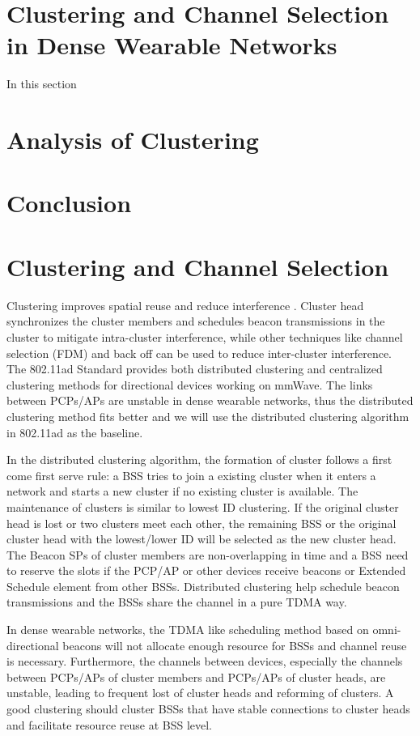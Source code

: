 \documentclass[10pt, conference, letterpaper]{IEEEtran}
\begin{document}
\section{Clustering and Channel Selection in Dense Wearable Networks}\label{section:MAC}
In this section 
\section{Analysis of Clustering}\label{section:clusteranalysis}
\section{Conclusion}\label{section:conclusion}

\newpage


\section{Clustering and Channel Selection}
Clustering improves spatial reuse and reduce interference \cite{80211ad}. Cluster head synchronizes the cluster members and schedules beacon transmissions in the cluster to mitigate intra-cluster interference, while other techniques like channel selection (FDM) and back off \cite{backoff} can be used to reduce inter-cluster interference. The 802.11ad Standard provides both distributed clustering and centralized clustering methods for directional devices working on mmWave. The links between PCPs/APs are unstable in dense wearable networks, thus the distributed clustering method fits better and we will use the distributed clustering algorithm in 802.11ad as the baseline.

In the distributed clustering algorithm, the formation of cluster follows a first come first serve rule: a BSS tries to join a existing cluster when it enters a network and starts a new cluster if no existing cluster is available. The maintenance of clusters is similar to lowest ID clustering. If the original cluster head is lost or two clusters meet each other, the remaining BSS or the original cluster head with the lowest/lower ID will be selected as the new cluster head. The Beacon SPs of cluster members are non-overlapping in time and a BSS need to reserve the slots if the PCP/AP or other devices receive beacons or Extended Schedule element from other BSSs. Distributed clustering help schedule beacon transmissions and the BSSs share the channel in a pure TDMA way. 

In dense wearable networks, the TDMA like scheduling method based on omni-directional beacons will not allocate enough resource for BSSs and channel reuse is necessary. Furthermore, the channels between devices, especially the channels between PCPs/APs of cluster members and PCPs/APs of cluster heads, are unstable, leading to frequent lost of cluster heads and reforming of clusters. A good clustering should cluster BSSs that have stable connections to cluster heads and facilitate resource reuse at BSS level.
\end{document}
